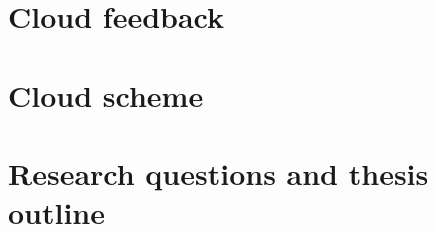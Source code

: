 \section{Cloud feedback}

\section{Cloud scheme}

\section{Research questions and thesis outline}
\label{sec:thesis_layout}
